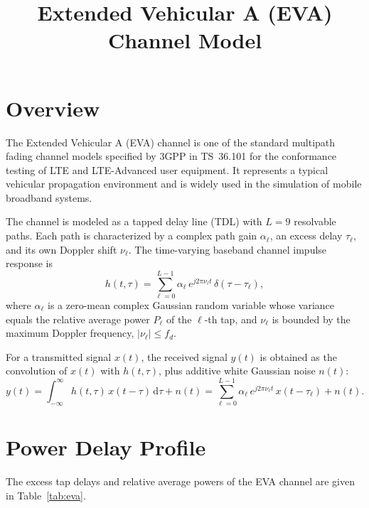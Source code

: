 \documentclass[11pt]{article}
\title{Extended Vehicular A (EVA) Channel Model}
\author{}
\date{}
\begin{document}
\maketitle

\section{Overview}
The Extended Vehicular A (EVA) channel is one of the standard multipath
fading channel models specified by 3GPP in TS~36.101 for the conformance
testing of LTE and LTE-Advanced user equipment. It represents a typical
vehicular propagation environment and is widely used in the simulation of
mobile broadband systems.

The channel is modeled as a tapped delay line (TDL) with $L = 9$ resolvable
paths. Each path is characterized by a complex path gain $\alpha_\ell$, an
excess delay $\tau_\ell$, and its own Doppler shift $\nu_\ell$. The
time-varying baseband channel impulse response is
\begin{equation}
    h(t,\tau) = \sum_{\ell=0}^{L-1} \alpha_\ell\,e^{j2\pi\nu_\ell t}\,\delta(\tau - \tau_\ell),
\end{equation}
where $\alpha_\ell$ is a zero-mean complex Gaussian random variable whose
variance equals the relative average power $P_\ell$ of the $\ell$-th tap,
and $\nu_\ell$ is bounded by the maximum Doppler frequency,
$|\nu_\ell| \le f_d$.

For a transmitted signal $x(t)$, the received signal $y(t)$ is obtained as
the convolution of $x(t)$ with $h(t,\tau)$, plus additive white Gaussian
noise $n(t)$:
\begin{equation}
    y(t) = \int_{-\infty}^{\infty} h(t,\tau)\,x(t-\tau)\,\mathrm{d}\tau + n(t)
         = \sum_{\ell=0}^{L-1} \alpha_\ell\,e^{j2\pi\nu_\ell t}\,x(t-\tau_\ell) + n(t).
\end{equation}

\section{Power Delay Profile}
The excess tap delays and relative average powers of the EVA channel are
given in Table~\ref{tab:eva}.
\end{document}
